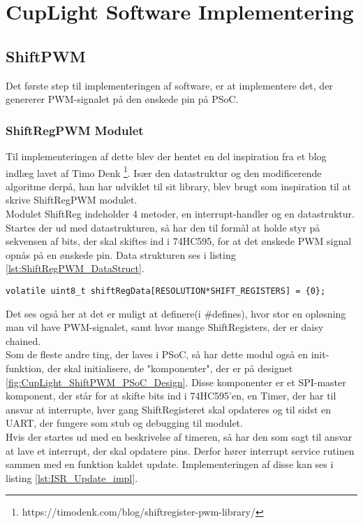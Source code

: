 \documentclass[Softwaredesign/Softwaredesign_main.tex]{subfiles}
\begin{document}

\lstset{escapechar=@,style=customc}

\section{CupLight Software Implementering}

\subsection{ShiftPWM}
Det første step til implementeringen af software, er at implementere det, der genererer PWM-signalet på den ønskede pin på PSoC. 
\subsubsection{ShiftRegPWM Modulet}
Til implementeringen af dette blev der hentet en del inspiration fra et blog indlæg lavet af Timo Denk \footnote{https://timodenk.com/blog/shiftregister-pwm-library/}. Især den datastruktur og den modificerende algoritme derpå,  han har udviklet til sit library, blev brugt som inspiration til at skrive ShiftRegPWM modulet. 
\\Modulet ShiftReg indeholder 4 metoder, en interrupt-handler og en datastruktur. Startes der ud med datastrukturen, så har den  til formål at holde styr på sekvensen af bits, der skal skiftes ind i 74HC595, for at det ønskede PWM signal opnås på en ønskede pin. Data strukturen ses i listing \ref{lst:ShiftRegPWM_DataStruct}.

\begin{lstlisting}[caption={Datastruktur for ShiftRegPWM}, label={lst:ShiftRegPWM_DataStruct}]
volatile uint8_t shiftRegData[RESOLUTION*SHIFT_REGISTERS] = {0};
\end{lstlisting}

Det ses også her at det er muligt at definere(i #defines), hvor stor en opløsning man vil have PWM-signalet, samt hvor mange ShiftRegisters, der er daisy chained. 
\\Som de fleste andre ting, der laves i PSoC, så har dette modul også en init-funktion, der skal initialisere, de "komponenter", der er på designet \ref{fig:CupLight_ShiftPWM_PSoC_Design}. Disse komponenter er et SPI-master komponent, der står for at skifte bits ind i 74HC595'en, en Timer, der har til ansvar at interrupte, hver gang ShiftRegisteret skal opdateres og til sidst en UART, der fungere som stub og debugging til modulet.
\\Hvis der startes ud med en beskrivelse af timeren, så har den som sagt til ansvar at lave et interrupt, der skal opdatere pins. Derfor hører interrupt service rutinen sammen med en funktion kaldet update. Implementeringen af disse kan ses i listing \ref{lst:ISR_Update_impl}.
\end{document}

